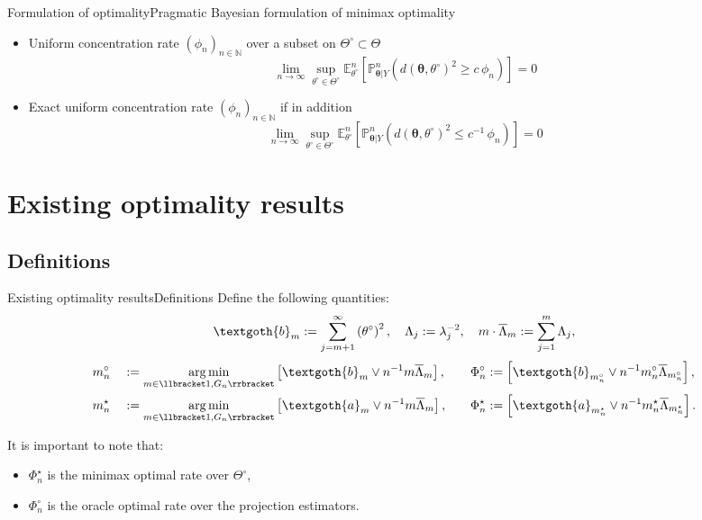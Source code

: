 \documentclass[10pt]{beamer}
\DeclareMathOperator*{\argmin}{arg\,min}
\begin{document}
\begin{frame}{Formulation of optimality}{Pragmatic Bayesian formulation of minimax optimality}
\begin{itemize}
\item Uniform concentration rate $(\phi_{n})_{n \in \mathbb{N}}$ over a subset on $\Theta^{\circ} \subset \Theta$
\[  \lim_{n \rightarrow \infty} \sup_{\theta^{\circ} \in \Theta^{\circ}} \mathbb{E}_{\theta^{\circ}}^{n}\left[ \mathbb{P}_{\boldsymbol{\theta}\vert Y}^{n} \left(d\left( \boldsymbol{\theta}, \theta^{\circ} \right)^{2} \geq c \, \phi_{n} \right) \right] = 0\]

\item Exact uniform concentration rate $(\phi_{n})_{n \in \mathbb{N}}$ if in addition
\[ \lim_{n \rightarrow \infty} \sup_{\theta^{\circ} \in \Theta^{\circ}} \mathbb{E}_{\theta^{\circ}}^{n}\left[ \mathbb{P}_{\boldsymbol{\theta}\vert Y}^{n} \left(d\left( \boldsymbol{\theta}, \theta^{\circ} \right)^{2} \leq c^{-1} \, \phi_{n} \right) \right] = 0 \]

\end{itemize}
\end{frame}

\section{Existing optimality results}
\subsection{Definitions}
\begin{frame}{Existing optimality results}{Definitions}
Define the following quantities:
\[\textgoth{b}_{m} := \sum\limits_{j = m + 1}^{\infty} \left(\theta^{\circ}\right)^{2}, \quad \Lambda_{j} := \lambda_{j}^{-2}, \quad m \cdot \overline{\Lambda}_{m} := \sum\limits_{j = 1}^{m} \Lambda_{j},\]
\begin{alignat*}{3}
&m_{n}^{\circ} &&:= \argmin\limits_{m \in \llbracket 1, G_{n} \rrbracket} \left[\textgoth{b}_{m} \vee n^{-1} m \overline{\Lambda}_{m}\right], && \quad \Phi_{n}^{\circ} := \left[\textgoth{b}_{m_{n}^{\circ}}\vee n^{-1} m_{n}^{\circ} \overline{\Lambda}_{m_{n}^{\circ}}\right],\\
&m_{n}^{\star} &&:= \argmin\limits_{m \in \llbracket 1, G_{n} \rrbracket} \left[\textgoth{a}_{m} \vee n^{-1} m \overline{\Lambda}_{m}\right], && \quad \Phi_{n}^{\star} := \left[\textgoth{a}_{m_{n}^{\star}} \vee n^{-1} m_{n}^{\star} \overline{\Lambda}_{m_{n}^{\star}}\right].
\end{alignat*}

It is important to note that:
\begin{itemize}
\item $\Phi_{n}^{\star}$ is the minimax optimal rate over $\Theta^{\circ}$,
\item $\Phi_{n}^{\circ}$ is the oracle optimal rate over the projection estimators.
\end{itemize}

\end{frame}
\end{document}
